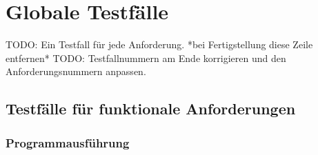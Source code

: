 \section{Globale Testfälle}

TODO: Ein Testfall für jede Anforderung. *bei Fertigstellung diese Zeile entfernen*
TODO: Testfallnummern am Ende korrigieren und den Anforderungsnummern anpassen.

\subsection{Testfälle für funktionale Anforderungen}
	
	\subsubsection{Programmausführung}
	
